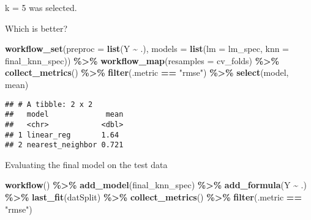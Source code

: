 \documentclass[
]{article}
\newenvironment{Shaded}{\begin{snugshade}}{\end{snugshade}}
\newcommand{\AttributeTok}[1]{\textcolor[rgb]{0.13,0.29,0.53}{#1}}
\newcommand{\CommentTok}[1]{\textcolor[rgb]{0.56,0.35,0.01}{\textit{#1}}}
\newcommand{\FunctionTok}[1]{\textcolor[rgb]{0.13,0.29,0.53}{\textbf{#1}}}
\newcommand{\NormalTok}[1]{#1}
\newcommand{\OtherTok}[1]{\textcolor[rgb]{0.56,0.35,0.01}{#1}}
\newcommand{\SpecialCharTok}[1]{\textcolor[rgb]{0.81,0.36,0.00}{\textbf{#1}}}
\newcommand{\StringTok}[1]{\textcolor[rgb]{0.31,0.60,0.02}{#1}}
\begin{document}
k = 5 was selected.

\begin{Shaded}
\end{Shaded}

Which is better?

\begin{Shaded}
\begin{Highlighting}[]
\FunctionTok{workflow\_set}\NormalTok{(}\AttributeTok{preproc =} \FunctionTok{list}\NormalTok{(Y }\SpecialCharTok{\textasciitilde{}}\NormalTok{ .),}
             \AttributeTok{models =} \FunctionTok{list}\NormalTok{(}\AttributeTok{lm =}\NormalTok{ lm\_spec, }\AttributeTok{knn =}\NormalTok{ final\_knn\_spec)) }\SpecialCharTok{\%\textgreater{}\%}
\FunctionTok{workflow\_map}\NormalTok{(}\AttributeTok{resamples =}\NormalTok{ cv\_folds) }\SpecialCharTok{\%\textgreater{}\%} 
  \FunctionTok{collect\_metrics}\NormalTok{() }\SpecialCharTok{\%\textgreater{}\%}
  \FunctionTok{filter}\NormalTok{(.metric }\SpecialCharTok{==} \StringTok{"rmse"}\NormalTok{) }\SpecialCharTok{\%\textgreater{}\%}
  \FunctionTok{select}\NormalTok{(model, mean)}
\end{Highlighting}
\end{Shaded}

\begin{verbatim}
## # A tibble: 2 x 2
##   model             mean
##   <chr>            <dbl>
## 1 linear_reg       1.64 
## 2 nearest_neighbor 0.721
\end{verbatim}

Evaluating the final model on the test data

\begin{Shaded}
\begin{Highlighting}[]
\FunctionTok{workflow}\NormalTok{() }\SpecialCharTok{\%\textgreater{}\%}
  \FunctionTok{add\_model}\NormalTok{(final\_knn\_spec) }\SpecialCharTok{\%\textgreater{}\%}
  \FunctionTok{add\_formula}\NormalTok{(Y }\SpecialCharTok{\textasciitilde{}}\NormalTok{ .) }\SpecialCharTok{\%\textgreater{}\%}
  \FunctionTok{last\_fit}\NormalTok{(datSplit) }\SpecialCharTok{\%\textgreater{}\%} 
  \FunctionTok{collect\_metrics}\NormalTok{() }\SpecialCharTok{\%\textgreater{}\%}
  \FunctionTok{filter}\NormalTok{(.metric }\SpecialCharTok{==} \StringTok{"rmse"}\NormalTok{)}
\end{Highlighting}
\end{Shaded}
\end{document}
